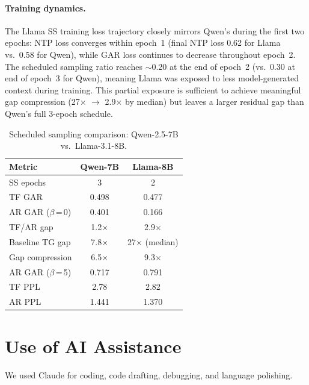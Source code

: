 \paragraph{Training dynamics.}
The Llama SS training loss trajectory closely mirrors Qwen's during the first two epochs: NTP loss converges within epoch~1 (final NTP loss 0.62 for Llama vs.\ 0.58 for Qwen), while GAR loss continues to decrease throughout epoch~2. The scheduled sampling ratio reaches ${\sim}$0.20 at the end of epoch~2 (vs.\ 0.30 at end of epoch~3 for Qwen), meaning Llama was exposed to less model-generated context during training. This partial exposure is sufficient to achieve meaningful gap compression (27$\times$ $\to$ 2.9$\times$ by median) but leaves a larger residual gap than Qwen's full 3-epoch schedule.

\begin{table}[t]
\raggedright\small
\caption{Scheduled sampling comparison: Qwen-2.5-7B vs.\ Llama-3.1-8B.}
\label{tab:llama-vs-qwen-ss}
\begin{tabular}{@{}l cc@{}}
\toprule
\textbf{Metric} & \textbf{Qwen-7B} & \textbf{Llama-8B} \\
\midrule
SS epochs & 3 & 2 \\
TF GAR & 0.498 & 0.477 \\
AR GAR ($\beta$\,=\,0) & 0.401 & 0.166 \\
TF/AR gap & 1.2$\times$ & 2.9$\times$ \\
Baseline TG gap & 7.8$\times$ & 27$\times$ (median) \\
Gap compression & 6.5$\times$ & 9.3$\times$ \\
AR GAR ($\beta$\,=\,5) & 0.717 & 0.791 \\
TF PPL & 2.78 & 2.82 \\
AR PPL & 1.441 & 1.370 \\
\bottomrule
\end{tabular}
\end{table}

\section{Use of AI Assistance}
We used Claude for coding, code drafting, debugging, and language polishing.
